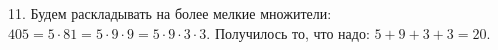 11. Будем раскладывать на более мелкие множители: $405=5\cdot81=5\cdot9\cdot9=5\cdot9\cdot3\cdot3.$ Получилось то, что надо: $5+9+3+3=20.$\\
